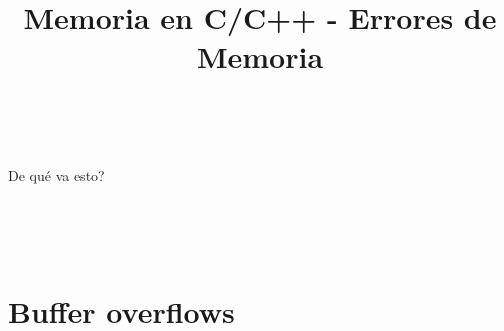 

\title%
{Memoria en C/C++ - Errores de Memoria}


\subject{Memoria en C/C++ - Errores de Memoria}




\begin{frame}
   \titlepage
\end{frame}

~%
\begin{frame}{De qu\'e va esto?}
   \tableofcontents
\end{frame}
~%

~%
\section{Buffer overflows}
